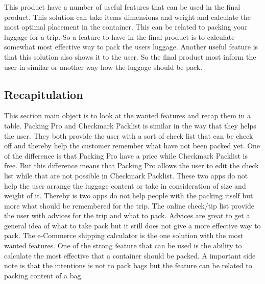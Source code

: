 
This product have a number of useful features that can be used in the final product. This solution can take items dimensions and weight and calculate the most optimal placement in the container. This can be related to packing your luggage for a trip. So a feature to have in the final product is to  calculate somewhat most effective way to pack the users luggage. Another useful feature is that this solution also shows it to the user. So the final product most inform the user in similar or another way how the luggage should be pack.

\subsection*{Recapitulation}

This section main object is to look at the wanted features and recap them in a table.
Packing Pro and Checkmark Packlist is similar in the way that they helps the user. They both provide the user with a sort of check list that can be check off and thereby help the customer remember what have not been packed yet.
One of the difference is that Packing Pro have a price while Checkmark Packlist is free. But this difference means that Packing Pro allows the user to edit the check list while that are not possible in Checkmark Packlist.
These two apps do not help the user arrange the luggage content or take in consideration of size and weight of it. Thereby is two apps do not help people with the packing itself but more what should be remembered for the trip.
The online check/tip list provide the user with advices for the trip and what to pack. Advices are great to get a general idea of what to take pack but it still does not give a more effective way to pack.
The e-Commerce shipping calculator is the one solution with the most wanted features. One of the strong feature that can be used is the ability to calculate the most effective that a container should be packed. A important side note is that the intentions is not to pack bags but the feature can be related to packing content of a bag.

